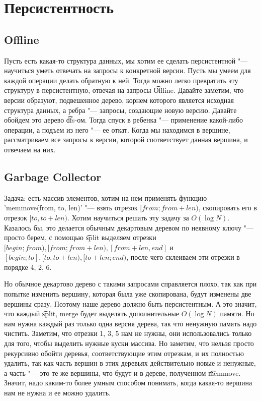 \section{Персистентность}

\subsection{Offline}         

Пусть есть какая-то структура данных, мы хотим ее сделать персистентной "--- научиться уметь отвечать на запросы к 
конкретной версии. 
Пусть мы умеем для каждой операции делать обратную к ней.
Тогда можно легко превратить эту структуру в персистентную, отвечая на запросы \t{Offline}.
Давайте заметим, что версии образуют, подвешенное дерево, корнем которого является исходная 
структура данных, а ребра "--- запросы, создающие новую версию. 
Давайте обойдем это дерево \t{dfs}-ом.
Тогда спуск в ребенка "--- применение какой-либо операции, а подъем из него "--- ее откат. 
Когда мы находимся в вершине, рассматриваем все запросы к версии, которой соответствует данная вершина, 
и отвечаем на них.

\subsection{Garbage Collector}

Задача: есть массив элементов, хотим на нем применять функцию \cpp'memmove(from, to, len)' 
"--- взять отрезок $[from; from + len)$, скопировать его в отрезок $[to, to + len)$.
Хотим научиться решать эту задачу за $O(\log N)$.
Казалось бы, это делается обычным декартовым деревом по неявному ключу "--- просто берем,
с помощью \t{split} выделяем отрезки $[begin; from), [from; from + len), [from + len, end]$ и 
$[begin; to], [to, to + len), [to + len; end)$, после чего склеиваем эти отрезки в порядке 4, 2, 6.

Но обычное декартово дерево с такими запросами справляется плохо, так как при попытке изменить вершину,
которая была уже скопирована, будут изменены две вершины сразу.
Поэтому наше дерево должно быть персистентным. А это значит, что каждый \t{split, merge} будет
выделять дополнительные $O(\log N)$ памяти. 
Но нам нужна каждый раз только одна версия дерева, так что ненужную память надо чистить.
Заметим, что отрезки 1, 3, 5 нам не нужны, они использовались только для того, чтобы выделить
нужные куски массива. 
Но заметим, что нельзя просто рекурсивно обойти деревья, соответствующие этим отрезкам, и их
полностью удалить, так как часть вершин в этих деревьях действительно новые и ненужные, а часть
"--- это те же вершины, что будут и в дереве, полученном \t{memmove}.
Значит, надо каким-то более умным способом понимать, когда какая-то вершина нам не нужна и ее
можно удалить.

